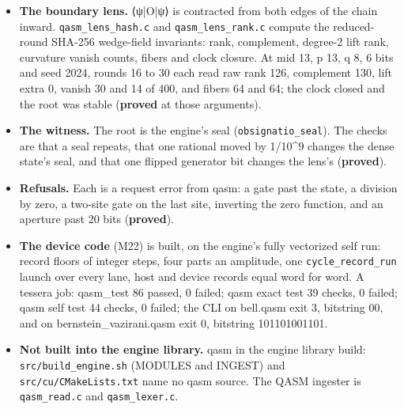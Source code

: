 \begin{itemize}
\begin{itemize}
\item Delta-Bell: bond [2]; ⟨00⟩ = “1/2sqrt2”, ⟨11⟩ = “(1/2sqrt2)w”, ⟨ψ|ψ⟩ = 1.
\item ⟨X0X1⟩ = “(1/2 + (1/2)w\textasciicircum{}2) / (w)”, ⟨Z0Z1⟩ = 1, ⟨X0⟩ = 0.
\item Delta-GHZ3: bonds [2,2], and ⟨X0X1X2⟩ is the same function.
\item |+++⟩ with a phase on wire 0 retains bonds [1,1].
\item At ω = e\textasciicircum{}\{iπ/4\}, ⟨X0X1⟩ equals the numeric controlled-T reading, “1/2sqrt2”, and the norm is exactly 1.
\end{itemize}
\item \textbf{The boundary lens.} ⟨ψ|O|ψ⟩ is contracted from both edges of the chain inward. \texttt{qasm\_\allowbreak{}lens\_\allowbreak{}hash.\allowbreak{}c} and \texttt{qasm\_\allowbreak{}lens\_\allowbreak{}rank.\allowbreak{}c} compute the reduced-round SHA-256 wedge-field invariants: rank, complement, degree-2 lift rank, curvature vanish counts, fibers and clock closure. At mid 13, p 13, q 8, 6 bits and seed 2024, rounds 16 to 30 each read raw rank 126, complement 130, lift extra 0, vanish 30 and 14 of 400, and fibers 64 and 64; the clock closed and the root was stable (\textbf{proved} at those arguments).
\item \textbf{The witness.} The root is the engine's seal (\texttt{obsignatio\_\allowbreak{}seal}). The checks are that a seal repeats, that one rational moved by 1/10\textasciicircum{}9 changes the dense state's seal, and that one flipped generator bit changes the lens's (\textbf{proved}).
\item \textbf{Refusals.} Each is a request error from qasm: a gate past the state, a division by zero, a two-site gate on the last site, inverting the zero function, and an aperture past 20 bits (\textbf{proved}).
\item \textbf{The device code} (M22) is built, on the engine's fully vectorized self run: record floors of integer steps, four parts an amplitude, one \texttt{cycle\_\allowbreak{}record\_\allowbreak{}run} launch over every lane, host and device records equal word for word. A tessera job: qasm\_\allowbreak{}test 86 passed, 0 failed; qasm exact test 39 checks, 0 failed; qasm self test 44 checks, 0 failed; the CLI on bell.qasm exit 3, bitstring 00, and on bernstein\_\allowbreak{}vazirani.qasm exit 0, bitstring 101101001101.
\item \textbf{Not built into the engine library.} qasm in the engine library build: \texttt{src/\allowbreak{}build\_\allowbreak{}engine.\allowbreak{}sh} (MODULES and INGEST) and \texttt{src/\allowbreak{}cu/\allowbreak{}CMake\allowbreak{}Lists.\allowbreak{}txt} name no qasm source. The QASM ingester is \texttt{qasm\_\allowbreak{}read.\allowbreak{}c} and \texttt{qasm\_\allowbreak{}lexer.\allowbreak{}c}.
\end{itemize}


